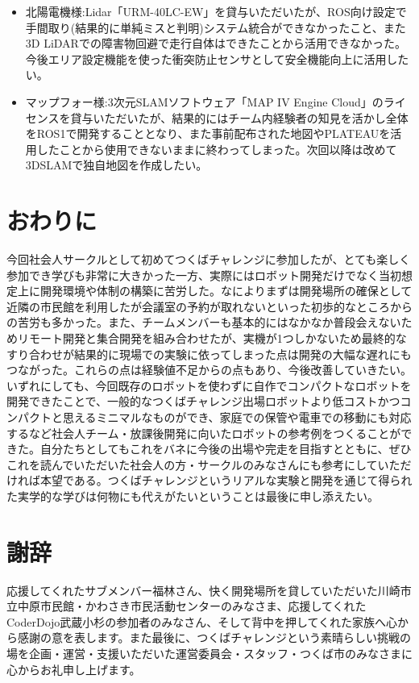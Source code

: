 \documentclass[platex,dvipdfmx]{rbproceedings}
\begin{document}
\begin{itemize}
\item 北陽電機様:Lidar「URM-40LC-EW」を貸与いただいたが、ROS向け設定で手間取り(結果的に単純ミスと判明)システム統合ができなかったこと、また3D LiDARでの障害物回避で走行自体はできたことから活用できなかった。今後エリア設定機能を使った衝突防止センサとして安全機能向上に活用したい。
\item マップフォー様:3次元SLAMソフトウェア「MAP IV Engine Cloud」のライセンスを貸与いただいたが、結果的にはチーム内経験者の知見を活かし全体をROS1で開発することとなり、また事前配布された地図やPLATEAUを活用したことから使用できないままに終わってしまった。次回以降は改めて3DSLAMで独自地図を作成したい。
\end{itemize}

\section{おわりに}
今回社会人サークルとして初めてつくばチャレンジに参加したが、とても楽しく参加でき学びも非常に大きかった一方、実際にはロボット開発だけでなく当初想定上に開発環境や体制の構築に苦労した。なによりまずは開発場所の確保として近隣の市民館を利用したが会議室の予約が取れないといった初歩的なところからの苦労も多かった。また、チームメンバーも基本的にはなかなか普段会えないためリモート開発と集合開発を組み合わせたが、実機が1つしかないため最終的なすり合わせが結果的に現場での実験に依ってしまった点は開発の大幅な遅れにもつながった。これらの点は経験値不足からの点もあり、今後改善していきたい。
いずれにしても、今回既存のロボットを使わずに自作でコンパクトなロボットを開発できたことで、一般的なつくばチャレンジ出場ロボットより低コストかつコンパクトと思えるミニマルなものができ、家庭での保管や電車での移動にも対応するなど社会人チーム・放課後開発に向いたロボットの参考例をつくることができた。自分たちとしてもこれをバネに今後の出場や完走を目指すとともに、ぜひこれを読んでいただいた社会人の方・サークルのみなさんにも参考にしていただければ本望である。つくばチャレンジというリアルな実験と開発を通じて得られた実学的な学びは何物にも代えがたいということは最後に申し添えたい。

\section{謝辞}
応援してくれたサブメンバー福林さん、快く開発場所を貸していただいた川崎市立中原市民館・かわさき市民活動センターのみなさま、応援してくれたCoderDojo武蔵小杉の参加者のみなさん、そして背中を押してくれた家族へ心から感謝の意を表します。また最後に、つくばチャレンジという素晴らしい挑戦の場を企画・運営・支援いただいた運営委員会・スタッフ・つくば市のみなさまに心からお礼申し上げます。


\end{document}
